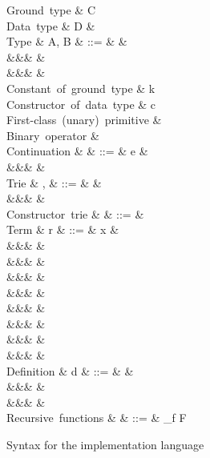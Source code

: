 \begin{figure}
\begin{syntaxfig}
\mbox{Ground type}
&
C
\\[2mm]
\mbox{Data type}
&
D
&
\\[2mm]
\mbox{Type}
&
A, B
&
::=
&
&
\\
&&&
&
\\
&&&
&
\\[2mm]
\mbox{Constant of ground type}
&
k
\\
\mbox{Constructor of data type}
&
c
\\
\mbox{First-class (unary) primitive}
&
\phi
\\
\mbox{Binary operator}
&
\primOp
\\[2mm]
\mbox{Continuation}
&
\kappa
&
::=
&
e
&
\\
&&&
\sigma
&
\\[2mm]
\mbox{Trie}
&
\sigma, \tau
&
::=
&
&
\\
&&&
\trieConstr{\Sigma}
&
\\[2mm]
\mbox{Constructor trie}
&
\Sigma
&
::=
&
\\[2mm]
\mbox{Term}
&
r
&
::=
&
x
&
\\
&&&
&
\\
&&&
\phi
&
\\
&&&
\exFun{\sigma}
&
\\
&&&
&
\\
&&&
&
\\
&&&
&
\\
&&&
&
\\
&&&
&
\\[2mm]
\mbox{Definition}
&
d
&
::=
&
&
\\
&&&
\exLetrecDef{\delta}
&
\\
&&&
&
\\[2mm]
\mbox{Recursive functions}
&
\delta
&
::=
&
_{f \in F}
\end{syntaxfig}
\caption{Syntax for the implementation language}
\label{fig:impl-language:syntax}
\end{figure}
